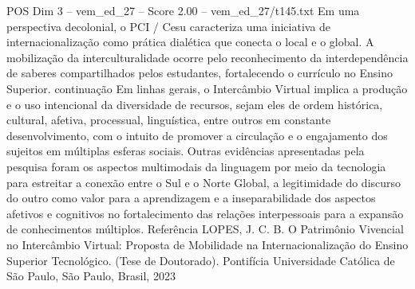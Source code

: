 \begin{textsample}{POS Dim 3 – vem\_ed\_27 – Score 2.00 – vem\_ed\_27/t145.txt}
Em uma perspectiva decolonial, o PCI / Cesu caracteriza uma iniciativa de internacionalização como prática dialética que conecta o local e o global.
A mobilização da interculturalidade ocorre pelo reconhecimento da interdependência de saberes compartilhados pelos estudantes, fortalecendo o currículo no Ensino Superior. continuação Em linhas gerais, o Intercâmbio Virtual implica a produção e o uso intencional da diversidade de recursos, sejam eles de ordem histórica, cultural, afetiva, processual, linguística, entre outros em constante desenvolvimento, com o intuito de promover a circulação e o engajamento dos sujeitos em múltiplas esferas sociais.
Outras evidências apresentadas pela pesquisa foram os aspectos multimodais da linguagem por meio da tecnologia para estreitar a conexão entre o Sul e o Norte Global, a legitimidade do discurso do outro como valor para a aprendizagem e a inseparabilidade dos aspectos afetivos e cognitivos no fortalecimento das relações interpessoais para a expansão de conhecimentos múltiplos.
Referência LOPES, J.
C.
B.
O Patrimônio Vivencial no Intercâmbio Virtual: Proposta de Mobilidade na Internacionalização do Ensino Superior Tecnológico. (Tese de Doutorado).
Pontifícia Universidade Católica de São Paulo, São Paulo, Brasil, 2023

\end{textsample}
